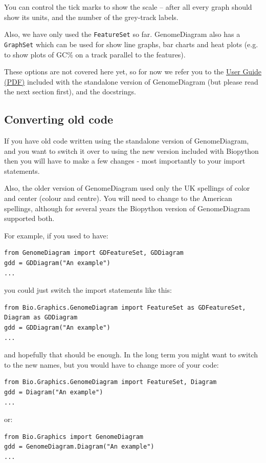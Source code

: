 \documentclass{report}
\begin{document}
You can control the tick marks to show the scale -- after all every graph
should show its units, and the number of the grey-track labels.

Also, we have only used the \verb|FeatureSet| so far. GenomeDiagram also has
a \verb|GraphSet| which can be used for show line graphs, bar charts and heat
plots (e.g. to show plots of GC\% on a track parallel to the features).

These options are not covered here yet, so for now we refer you to the
\href{http://biopython.org/DIST/docs/GenomeDiagram/userguide.pdf}
{User Guide (PDF)} included with the standalone version of GenomeDiagram (but
please read the next section first), and the docstrings.

\subsection{Converting old code}

If you have old code written using the standalone version of GenomeDiagram, and
you want to switch it over to using the new version included with Biopython then
you will have to make a few changes - most importantly to your import statements.

Also, the older version of GenomeDiagram used only the UK spellings of color and
center (colour and centre).  You will need to change to the American spellings,
although for several years the Biopython version of GenomeDiagram supported both.

For example, if you used to have:
\begin{verbatim}
from GenomeDiagram import GDFeatureSet, GDDiagram
gdd = GDDiagram("An example")
...
\end{verbatim}
you could just switch the import statements like this:
\begin{verbatim}
from Bio.Graphics.GenomeDiagram import FeatureSet as GDFeatureSet, Diagram as GDDiagram
gdd = GDDiagram("An example")
...
\end{verbatim}
and hopefully that should be enough.  In the long term you might want to
switch to the new names, but you would have to change more of your code:
\begin{verbatim}
from Bio.Graphics.GenomeDiagram import FeatureSet, Diagram
gdd = Diagram("An example")
...
\end{verbatim}
or:
\begin{verbatim}
from Bio.Graphics import GenomeDiagram
gdd = GenomeDiagram.Diagram("An example")
...
\end{verbatim}
\end{document}
